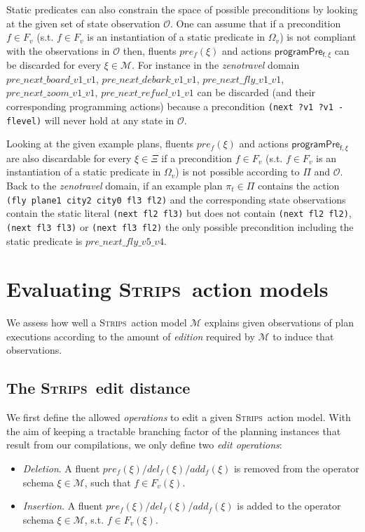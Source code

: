 \documentclass[3p,times]{elsarticle}
\newcommand{\strips}{\textsc{Strips}}     %
\begin{document}
Static predicates can also constrain the space of possible preconditions by looking at the given set of state observation $\mathcal{O}$. One can assume that if a precondition $f\in F_v$ (s.t. $f\in F_v$ is an instantiation of a static predicate in $\Omega_v$) is not compliant with the observations in $\mathcal{O}$ then, fluents $pre_f(\xi)$ and actions $\mathsf{programPre_{f,\xi}}$ can be discarded for every $\xi\in\mathcal{M}$. For instance in the {\em zenotravel} domain $pre\_next\_board\_v1\_v1$, $pre\_next\_debark\_v1\_v1$, $pre\_next\_fly\_v1\_v1$, $pre\_next\_zoom\_v1\_v1$, $pre\_next\_refuel\_v1\_v1$ can be discarded (and their corresponding programming actions) because a precondition {\tt\small(next ?v1 ?v1 - flevel)} will never hold at any state in $\mathcal{O}$.

Looking at the given example plans, fluents $pre_f(\xi)$ and actions $\mathsf{programPre_{f,\xi}}$ are also discardable for every $\xi\in\Xi$ if a precondition $f\in F_v$ (s.t. $f\in F_v$ is an instantiation of a static predicate in $\Omega_v$) is not possible according to $\Pi$ and $\mathcal{O}$. Back to the {\em zenotravel} domain, if an example plan $\pi_t\in \Pi$ contains the action {\tt\small (fly plane1 city2 city0 fl3 fl2)} and the corresponding state observations contain the static literal {\tt\small (next fl2 fl3)} but does not contain {\tt\small (next fl2 fl2)}, {\tt\small (next fl3 fl3)} or {\tt\small (next fl3 fl2)} the only possible precondition including the static predicate is $pre\_next\_fly\_v5\_v4$.



\section{Evaluating \strips\ action models}
\label{sec:Section6}
We assess how well a \strips\ action model $\mathcal{M}$ explains given observations of plan executions according to the amount of {\em edition} required by $\mathcal{M}$ to induce that observations. %

\subsection{The \strips\ edit distance}

We first define the allowed \emph{operations} to edit a given \strips\ action model. With the aim of keeping a tractable branching factor of the planning instances that result from our compilations, we only define two {\em edit operations}:
\begin{itemize}
\item {\em Deletion}. A fluent $pre_f(\xi)/del_f(\xi)/add_f(\xi)$ is removed from the operator schema $\xi\in\mathcal{M}$, such that $f\in F_v(\xi)$.
\item {\em Insertion}. A fluent $pre_f(\xi)/del_f(\xi)/add_f(\xi)$ is added to the operator schema $\xi\in\mathcal{M}$, s.t. $f\in F_v(\xi)$.
\end{itemize}
\end{document}

